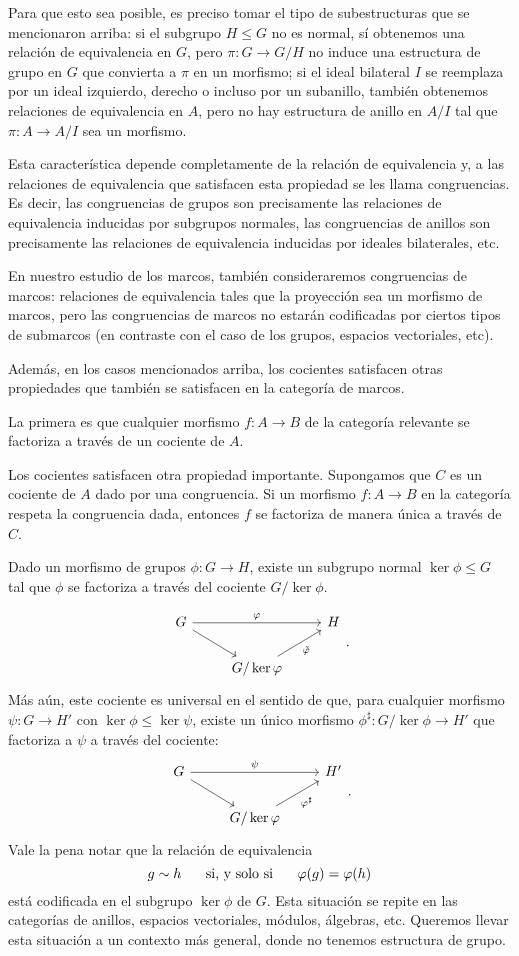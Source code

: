 Para que esto sea posible, es preciso tomar el tipo
de subestructuras que se mencionaron arriba: si el subgrupo $H\leq
G$ no es normal, sí obtenemos una relación de equivalencia en
$G$, pero $\pi:G\to G/H$ no induce una estructura de grupo en $G$
que convierta a $\pi$ en un morfismo;
si el ideal bilateral $I$ se reemplaza por un ideal izquierdo,
derecho o incluso por un subanillo, también obtenemos relaciones
de equivalencia en $A$, pero no hay estructura de anillo en $A/I$
tal que $\pi:A\to A/I$ sea un morfismo.

Esta característica depende completamente de la relación de
equivalencia y, a las relaciones de equivalencia que satisfacen
esta propiedad se les llama congruencias.
Es decir, las congruencias de grupos son precisamente las
relaciones de equivalencia inducidas por subgrupos normales, las
congruencias de anillos son precisamente las relaciones de
equivalencia inducidas por ideales bilaterales, etc.

En nuestro estudio de los marcos, también consideraremos
congruencias de marcos: relaciones de equivalencia
tales que la proyección sea un morfismo de marcos, pero las
congruencias de marcos no estarán codificadas por ciertos tipos
de submarcos (en contraste con el caso de los grupos, espacios
vectoriales, etc).

Además, en los casos mencionados arriba,
los cocientes satisfacen otras propiedades que también se
satisfacen en la categoría de marcos.

La primera es que cualquier morfismo $f:A\to B$ de la categoría
relevante se factoriza a través de un cociente de $A$.

Los cocientes satisfacen otra propiedad importante.
Supongamos que $C$ es un cociente de $A$ dado por una
congruencia. Si un morfismo $f:A\to B$ en la categoría
respeta la congruencia dada, entonces $f$ se factoriza de manera
única a través de $C$.

Dado un morfismo de grupos $\phi:G\to H$, existe un subgrupo normal
$\ker \phi\leq G$ tal que $\phi$ se factoriza a través del cociente
$G/\ker \phi$.

\[
    \begin{tikzcd}
        G \ar[dr] \ar[rr,"\phi"] && H \\
        &G/\ker \phi \ar[ur,"\tilde\phi"']
    \end{tikzcd}
.\]
Más aún, este cociente es universal en el sentido de que, para cualquier 
morfismo $\psi:G\to H'$ con $\ker\phi \leq \ker\psi$, existe un único
morfismo $\phi^\sharp:G/\ker\phi\to H'$ que factoriza a $\psi$ a través
del cociente:
\[
    \begin{tikzcd}
        G \ar[dr] \ar[rr,"\psi"] && H' \\
        &G/\ker \phi \ar[ur,"\phi^\sharp"']
    \end{tikzcd}
.\]
Vale la pena notar que la relación de equivalencia
\[
    g\sim h \hspace{5mm}\text{ si, y solo si }\hspace{5mm} \varphi(g) = \varphi(h)
\]
está codificada en el subgrupo $\ker \phi$ de $G$.
Esta situación se repite en las categorías de anillos,
espacios vectoriales, módulos, álgebras, etc.
Queremos llevar esta situación a un contexto más general,
donde no tenemos estructura de grupo.


